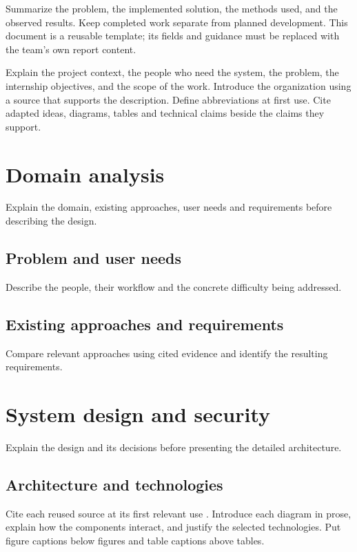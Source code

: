 \documentclass{../shared/classes/utmreport}
\begin{document}
\makeutminternshiptitlepage
\tableofcontents
\clearpage

\begin{utmabstract}[Abstract]
Summarize the problem, the implemented solution, the methods used, and the observed results. Keep completed work separate from planned development. This document is a reusable template; its fields and guidance must be replaced with the team's own report content.
\end{utmabstract}

\utmintroduction
Explain the project context, the people who need the system, the problem, the internship objectives, and the scope of the work. Introduce the organization using a source that supports the description. Define abbreviations at first use. Cite adapted ideas, diagrams, tables and technical claims beside the claims they support.

\chapter{Domain analysis}
Explain the domain, existing approaches, user needs and requirements before describing the design.
\section{Problem and user needs}
Describe the people, their workflow and the concrete difficulty being addressed.
\section{Existing approaches and requirements}
Compare relevant approaches using cited evidence and identify the resulting requirements.

\chapter{System design and security}
Explain the design and its decisions before presenting the detailed architecture.
\section{Architecture and technologies}
Cite each reused source at its first relevant use \cite{source}. Introduce each diagram in prose, explain how the components interact, and justify the selected technologies. Put figure captions below figures and table captions above tables.
\end{document}
